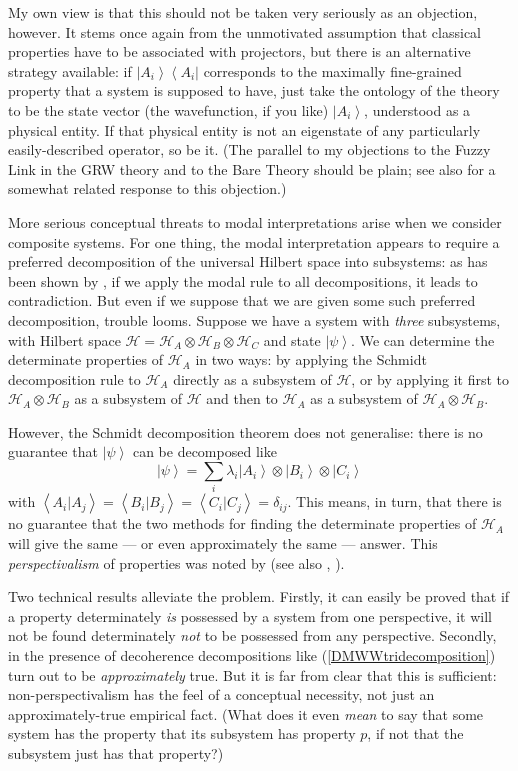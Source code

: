 \documentclass[12pt]{article}
\newcommand{\be}{\begin{equation}}
\newcommand{\ee}{\end{equation}}
\newcommand{\mc}[1]{\ensuremath{\mathcal{#1}}}
\newcommand{\ket}[1]{\ensuremath{\left|  #1 \right\rangle}}
\newcommand{\bra}[1]{\ensuremath{\left\langle #1 \right|}}
\newcommand{\bk}[2]{\ensuremath{\left\langle #1 | #2 \right\rangle}}
\newcommand{\proj}[2]{\ensuremath{\ket{#1} \bra{#2}}}
\begin{document}
My own view is that this should not be taken very seriously as an objection, however. It stems once again from the unmotivated assumption that classical properties have to be associated with projectors, but there is an alternative strategy available: if $\proj{A_i}{A_i}$ corresponds to the maximally fine-grained property that a system is supposed to have, just take the ontology of the theory to be the state vector (the wavefunction, if you like) \ket{A_i}, understood as a physical entity. If that physical entity is not an eigenstate of any particularly easily-described operator, so be it. (The parallel to my objections to the Fuzzy Link in the GRW theory and to the Bare Theory should be plain; see also  for a somewhat related response to this objection.)

More serious conceptual threats to modal interpretations arise when we consider composite systems. For one thing, the modal interpretation appears to require a preferred decomposition of the universal Hilbert space into subsystems: as has been shown by , if we apply the modal rule to all decompositions, it leads to contradiction. But even if we suppose that we are given some such preferred decomposition, trouble looms. Suppose we have a system with \emph{three} subsystems, with Hilbert space $\mc{H}=\mc{H}_A\otimes\mc{H}_B\otimes\mc{H}_C$ and state \ket{\psi}. We can determine the determinate properties of $\mc{H}_A$ in two ways: by applying the Schmidt decomposition rule to $\mc{H}_A$ directly as a subsystem of \mc{H}, or by applying it first to $\mc{H}_A \otimes \mc{H}_B$ as a subsystem of \mc{H} and then to $\mc{H}_A$ as a subsystem of $\mc{H}_A \otimes \mc{H}_B$.

However, the Schmidt decomposition theorem does not generalise: there is no guarantee that \ket{\psi} can be decomposed like
\be\label{DMWWtridecomposition}
\ket{\psi}=\sum_i \lambda_i \ket{A_i}\otimes \ket{B_i}\otimes \ket{C_i}
\ee
with $\bk{A_i}{A_j}=\bk{B_i}{B_j}=\bk{C_i}{C_j}=\delta_{ij}$.
This means, in turn, that there is no guarantee that the two methods for finding the determinate properties of $\mc{H}_A$ will give the same --- or even approximately the same --- answer. This \emph{perspectivalism} of properties was noted by  (see also , ).

Two technical results alleviate the problem. Firstly, it can easily be proved that if a property determinately \emph{is} possessed by a system from one perspective, it will not be found determinately \emph{not} to be possessed from any perspective. Secondly, in the presence of decoherence decompositions like (\ref{DMWWtridecomposition}) turn out to be \emph{approximately} true. But it is far from clear that this is sufficient: non-perspectivalism has the feel of a conceptual necessity, not just an approximately-true empirical fact. (What does it even \emph{mean} to say that some system has the property that its subsystem has property $p$, if not that the subsystem just has that property?)
\end{document}
